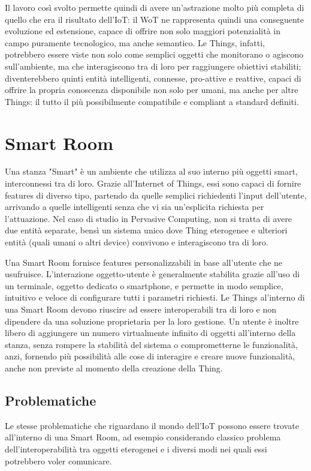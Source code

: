 \documentclass[12pt,a4paper,openright,oneside]{report}
\begin{document}
Il lavoro così svolto permette quindi di avere un'astrazione molto più completa di quello che era il risultato dell'IoT: il WoT ne rappresenta quindi una conseguente evoluzione ed estensione, capace di offrire non solo maggiori potenzialità in campo puramente tecnologico, ma anche semantico. Le Things, infatti, potrebbero essere viste non solo come semplici oggetti che monitorano o agiscono sull'ambiente, ma che interagiscono tra di loro per raggiungere obiettivi stabiliti; diventerebbero quinti entità intelligenti, connesse, pro-attive e reattive, capaci di offrire la propria conoscenza disponibile non solo per umani, ma anche per altre Things: il tutto il più possibilmente compatibile e compliant a standard definiti.

\section{Smart Room}
Una stanza "Smart" \cite{smartroom} è un ambiente che utilizza al suo interno più oggetti smart, interconnessi tra di loro. Grazie all'Internet of Things, essi sono capaci di fornire features di diverso tipo, partendo da quelle semplici richiedenti l'input dell'utente, arrivando a quelle intelligenti senza che vi sia un'esplicita richiesta per l'attuazione. Nel caso di studio in Pervasive Computing, non si tratta di avere due entità separate, bensì un sistema unico dove Thing eterogenee e ulteriori entità (quali umani o altri device) convivono e interagiscono tra di loro.

Una Smart Room fornisce features personalizzabili in base all'utente che ne usufruisce. L'interazione oggetto-utente è generalmente stabilita grazie all'uso di un terminale, oggetto dedicato o smartphone, e permette in modo semplice, intuitivo e veloce di configurare tutti i parametri richiesti. Le Things al'interno di una Smart Room devono riuscire ad essere interoperabili tra di loro e non dipendere da una soluzione proprietaria per la loro gestione. Un utente è inoltre libero di aggiungere un numero virtualmente infinito di oggetti all'interno della stanza, senza rompere la stabilità del sistema o comprometterne le funzionalità, anzi, fornendo più possibilità alle cose di interagire e creare nuove funzionalità, anche non previste al momento della creazione della Thing.

\subsection{Problematiche}
Le stesse problematiche che riguardano il mondo dell'IoT possono essere trovate all'interno di una Smart Room, ad esempio considerando classico problema dell'interoperabilità tra oggetti eterogenei e i diversi modi nei quali essi potrebbero voler comunicare.\\
\end{document}
